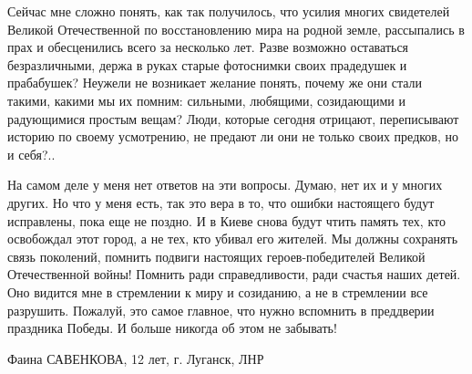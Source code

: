 Сейчас мне сложно понять, как так получилось, что усилия многих свидетелей
Великой Отечественной по восстановлению мира на родной земле, рассыпались в
прах и обесценились всего за несколько лет. Разве возможно оставаться
безразличными, держа в руках старые фотоснимки своих прадедушек и прабабушек?
Неужели не возникает желание понять, почему же они стали такими, какими мы их
помним: сильными, любящими, созидающими и радующимися простым вещам? Люди,
которые сегодня отрицают, переписывают историю по своему усмотрению, не предают
ли они не только своих предков, но и себя?..

На самом деле у меня нет ответов на эти вопросы. Думаю, нет их и у многих
других. Но что у меня есть, так это вера в то, что ошибки настоящего будут
исправлены, пока еще не поздно. И в Киеве снова будут чтить память тех, кто
освобождал этот город, а не тех, кто убивал его жителей. Мы должны сохранять
связь поколений, помнить подвиги настоящих героев-победителей Великой
Отечественной войны! Помнить ради справедливости, ради счастья наших детей. Оно
видится мне в стремлении к миру и созиданию, а не в стремлении все разрушить.
Пожалуй, это самое главное, что нужно вспомнить в преддверии праздника Победы.
И больше никогда об этом не забывать!

Фаина САВЕНКОВА, 12 лет, г. Луганск, ЛНР
